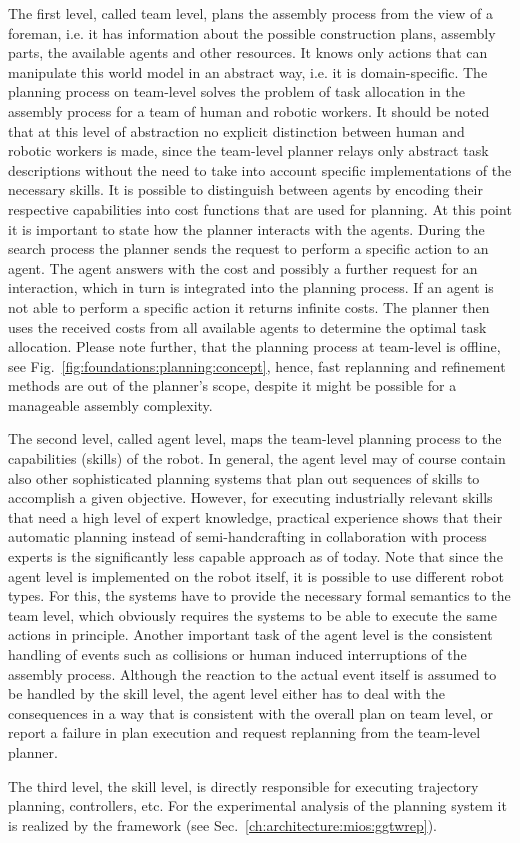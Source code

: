 The first level, called team level, plans the assembly process from the view of a foreman, i.e. it has information about the possible construction plans, assembly parts, the available agents and other resources.
It knows only actions that can manipulate this world model in an abstract way, i.e. it is domain-specific.
The planning process on team-level solves the problem of task allocation in the assembly process for a team of human and robotic workers.
It should be noted that at this level of abstraction no explicit distinction between human and robotic workers is made, since the team-level planner relays only abstract task descriptions without the need to take into account specific implementations of the necessary skills.
It is possible to distinguish between agents by encoding their respective capabilities into cost functions that are used for planning.
At this point it is important to state how the planner interacts with the agents.
During the search process the planner sends the request to perform a specific action to an agent.
The agent answers with the cost and possibly a further request for an interaction, which in turn is integrated into the planning process.
If an agent is not able to perform a specific action it returns infinite costs.
The planner then uses the received costs from all available agents to determine the optimal task allocation.
Please note further, that the planning process at team-level is offline, see Fig.~\ref{fig:foundations:planning:concept}, hence, fast replanning and refinement methods are out of the planner's scope, despite it might be possible for a manageable assembly complexity.

The second level, called agent level, maps the team-level planning process to the capabilities (skills) of the robot.
In general, the agent level may of course contain also other sophisticated planning systems that plan out sequences of skills to accomplish a given objective.
However, for executing industrially relevant skills that need a high level of expert knowledge, practical experience shows that their automatic planning instead of semi-handcrafting in collaboration with process experts is the significantly less capable approach as of today.
Note that since the agent level is implemented on the robot itself, it is possible to use different robot types.
For this, the systems have to provide the necessary formal semantics to the team level, which obviously requires the systems to be able to execute the same actions in principle.
Another important task of the agent level is the consistent handling of events such as collisions or human induced interruptions of the assembly process.
Although the reaction to the actual event itself is assumed to be handled by the skill level, the agent level either has to deal with the consequences in a way that is consistent with the overall plan on team level, or report a failure in plan execution and request replanning from the team-level planner.

The third level, the skill level, is directly responsible for executing trajectory planning, controllers, etc.
For the experimental analysis of the planning system it is realized by the \skillmodelabbr{} framework (see Sec.~\ref{ch:architecture:mios:ggtwrep}).